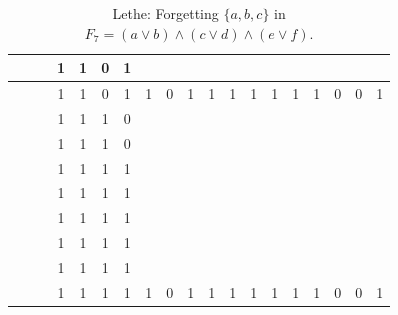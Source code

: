 \begin{table}[!tb]
\begin{tabular}{|c|c|c|c|c|c|c|c|c|c|c|c|c|c|c|c|c|c|c|}
        \rowcolor{blue!40}  &  &  & 1 & 1 & 0 & 1 &  &  &  &  &  &  &  &  &  &  &  &  \\ \hline
        \rowcolor{blue!40}  &  &  & 1 & 1 & 0 & 1 & 1 & 0 & 1 & 1 & 1 & 1 & 1 & 1 & 1 & 0 & 0 & 1 \\ \hline
        \rowcolor{red!40}  &  &  & 1 & 1 & 1 & 0 &  &  &  &  &  &  &  &  &  &  &  &  \\ \hline
        \rowcolor{red!40}  &  &  & 1 & 1 & 1 & 0 &  &  &  &  &  &  &  &  &  &  &  &  \\ \hline
        \rowcolor{red!40}  &  &  & 1 & 1 & 1 & 1 &  &  &  &  &  &  &  &  &  &  &  &  \\ \hline
        \rowcolor{red!40}  &  &  & 1 & 1 & 1 & 1 &  &  &  &  &  &  &  &  &  &  &  &  \\ \hline
        \rowcolor{red!40}  &  &  & 1 & 1 & 1 & 1 &  &  &  &  &  &  &  &  &  &  &  &  \\ \hline
        \rowcolor{red!40}  &  &  & 1 & 1 & 1 & 1 &  &  &  &  &  &  &  &  &  &  &  &  \\ \hline
        \rowcolor{red!40}  &  &  & 1 & 1 & 1 & 1 &  &  &  &  &  &  &  &  &  &  &  &  \\ \hline
        \rowcolor{red!40}  &  &  & 1 & 1 & 1 & 1 & 1 & 0 & 1 & 1 & 1 & 1 & 1 & 1 & 1 & 0 & 0 & 1 \\ \hline
    \end{tabular}
    \caption{Lethe: Forgetting $\{a, b, c\}$ in $F_{7} = (a \lor b) \land (c \lor d) \land (e \lor f)$.}
    \label{tab:lethe-F7-abc}
\end{table}
